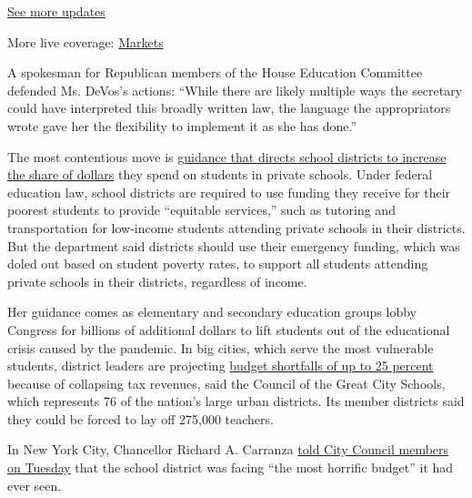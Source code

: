 \href{https://www.nytimes3xbfgragh.onion/2020/08/04/world/coronavirus-cases.html?action=click\&pgtype=Article\&state=default\&region=MAIN_CONTENT_1\&context=storylines_live_updates}{See
more updates}

More live coverage:
\href{https://www.nytimes3xbfgragh.onion/live/2020/08/04/business/stock-market-today-coronavirus?action=click\&pgtype=Article\&state=default\&region=MAIN_CONTENT_1\&context=storylines_live_updates}{Markets}

A spokesman for Republican members of the House Education Committee
defended Ms. DeVos's actions: ``While there are likely multiple ways the
secretary could have interpreted this broadly written law, the language
the appropriators wrote gave her the flexibility to implement it as she
has done.''

The most contentious move is
\href{https://www.chalkbeat.org/2020/5/5/21248179/equitable-services-coronavirus-private-schools}{guidance
that directs school districts to increase the share of dollars} they
spend on students in private schools. Under federal education law,
school districts are required to use funding they receive for their
poorest students to provide ``equitable services,'' such as tutoring and
transportation for low-income students attending private schools in
their districts. But the department said districts should use their
emergency funding, which was doled out based on student poverty rates,
to support all students attending private schools in their districts,
regardless of income.

Her guidance comes as elementary and secondary education groups lobby
Congress for billions of additional dollars to lift students out of the
educational crisis caused by the pandemic. In big cities, which serve
the most vulnerable students, district leaders are projecting
\href{https://www.politico.com/states/new-york/albany/story/2020/05/12/carranza-city-is-facing-most-horrific-budget-this-school-system-has-ever-seen-1283528}{budget
shortfalls of up to 25 percent} because of collapsing tax revenues, said
the Council of the Great City Schools, which represents 76 of the
nation's large urban districts. Its member districts said they could be
forced to lay off 275,000 teachers.

In New York City, Chancellor Richard A. Carranza
\href{https://ny.chalkbeat.org/2020/5/12/21256562/nyc-education-department-state-budget-cuts}{told
City Council members on Tuesday} that the school district was facing
``the most horrific budget'' it had ever seen.

